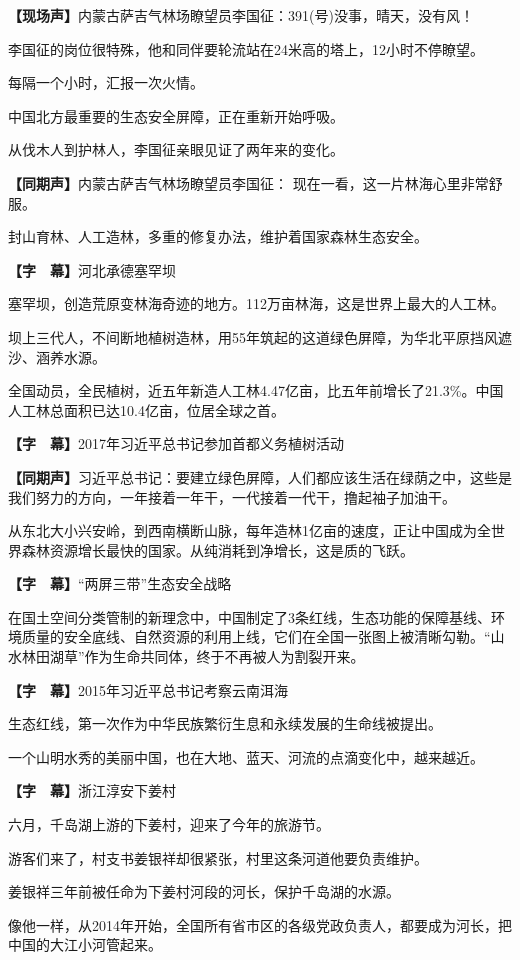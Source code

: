 \documentclass{ctexart}
\newcommand{\zkh}[1]{\textbf{\hspace{-2.7em} 【#1】}}
\begin{document}
 \zkh{现场声}内蒙古萨吉气林场瞭望员李国征：391(号)没事，晴天，没有风！

 
李国征的岗位很特殊，他和同伴要轮流站在24米高的塔上，12小时不停瞭望。

 每隔一个小时，汇报一次火情。

 中国北方最重要的生态安全屏障，正在重新开始呼吸。

 从伐木人到护林人，李国征亲眼见证了两年来的变化。

 \zkh{同期声}内蒙古萨吉气林场瞭望员李国征： 现在一看，这一片林海心里非常舒服。

 封山育林、人工造林，多重的修复办法，维护着国家森林生态安全。

 \zkh{字　幕}河北承德塞罕坝

 塞罕坝，创造荒原变林海奇迹的地方。112万亩林海，这是世界上最大的人工林。

坝上三代人，不间断地植树造林，用55年筑起的这道绿色屏障，为华北平原挡风遮沙、涵养水源。

全国动员，全民植树，近五年新造人工林4.47亿亩，比五年前增长了21.3{\%}。中国人工林总面积已达10.4亿亩，位居全球之首。

 \zkh{字　幕}2017年习近平总书记参加首都义务植树活动

 \zkh{同期声}习近平总书记：要建立绿色屏障，人们都应该生活在绿荫之中，这些是我们努力的方向，一年接着一年干，一代接着一代干，撸起袖子加油干。

 
从东北大小兴安岭，到西南横断山脉，每年造林1亿亩的速度，正让中国成为全世界森林资源增长最快的国家。从纯消耗到净增长，这是质的飞跃。

 \zkh{字　幕}``两屏三带''生态安全战略

 
在国土空间分类管制的新理念中，中国制定了3条红线，生态功能的保障基线、环境质量的安全底线、自然资源的利用上线，它们在全国一张图上被清晰勾勒。``山水林田湖草''作为生命共同体，终于不再被人为割裂开来。

 \zkh{字　幕}2015年习近平总书记考察云南洱海

 生态红线，第一次作为中华民族繁衍生息和永续发展的生命线被提出。

 一个山明水秀的美丽中国，也在大地、蓝天、河流的点滴变化中，越来越近。

 \zkh{字　幕}浙江淳安下姜村

 六月，千岛湖上游的下姜村，迎来了今年的旅游节。

 游客们来了，村支书姜银祥却很紧张，村里这条河道他要负责维护。

 姜银祥三年前被任命为下姜村河段的河长，保护千岛湖的水源。

像他一样，从2014年开始，全国所有省市区的各级党政负责人，都要成为河长，把中国的大江小河管起来。
\end{document}
